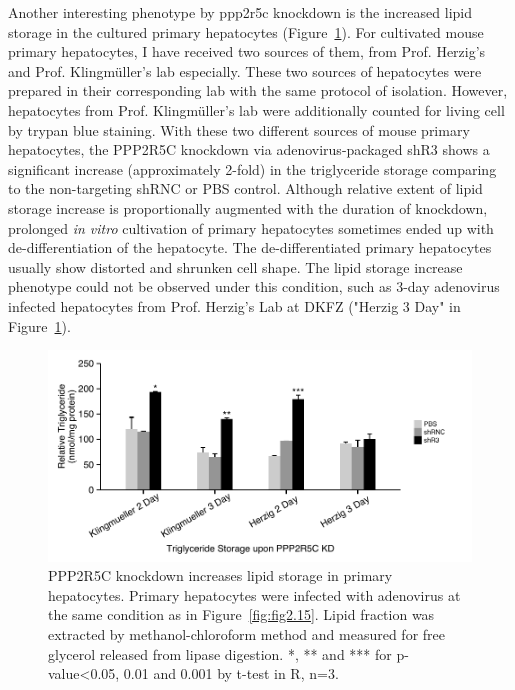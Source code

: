 Another interesting phenotype by \gls{ppp2r5c} knockdown is the increased lipid storage in the cultured primary hepatocytes (Figure~\ref{fig:fig2.16}). For cultivated mouse primary hepatocytes, I have received two sources of them, from Prof. Herzig's and Prof. Klingm\"uller's lab especially. These two sources of hepatocytes were prepared in their corresponding lab with the same protocol of isolation. However, hepatocytes from Prof. Klingm\"uller's lab were additionally counted for living cell by trypan blue staining. With these two different sources of mouse primary hepatocytes, the PPP2R5C knockdown via adenovirus-packaged shR3 shows a significant increase (approximately 2-fold) in the triglyceride storage comparing to the non-targeting shRNC or PBS control. Although relative extent of lipid storage increase is proportionally augmented with the duration of knockdown, prolonged \textit{in vitro} cultivation of primary hepatocytes sometimes ended up with de-differentiation of the hepatocyte. The de-differentiated primary hepatocytes usually show distorted and shrunken cell shape. The lipid storage increase phenotype could not be observed under this condition, such as 3-day adenovirus infected hepatocytes from Prof. Herzig's Lab at DKFZ ("Herzig 3 Day" in Figure~\ref{fig:fig2.16}). 

\begin{figure}[htbp]
\centering
\includegraphics[width=1\textwidth]{figs/fig2-16 1st hepa tag.pdf}
\caption[Triglyceride in primary hepatocytes upon PPP2R5C KD]{\footnotesize PPP2R5C knockdown increases lipid storage in primary hepatocytes. Primary hepatocytes were infected with adenovirus at the same condition as in Figure~\ref{fig:fig2.15}. Lipid fraction was extracted by methanol-chloroform method \cite{folch_simple_1957} and measured for free glycerol released from lipase digestion.  *, ** and *** for p-value<0.05, 0.01 and 0.001 by t-test in R, n=3.}
\label{fig:fig2.16}
\end{figure}

